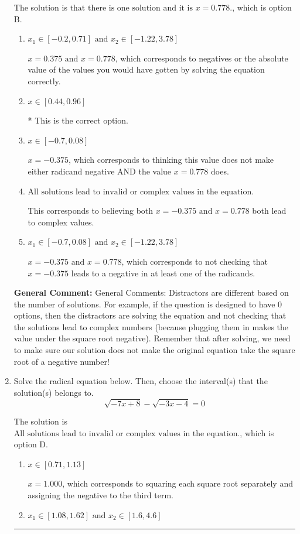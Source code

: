 \documentclass{extbook}[14pt]
\newcommand{\litem}[1]{\item #1

\rule{\textwidth}{0.4pt}}
\begin{document}
\begin{enumerate}
{The solution is \( \text{that there is one solution and it is } x = 0.778. \), which is option B.\begin{enumerate}[label=\Alph*.]
\item \( x_1 \in [-0.2, 0.71] \text{ and } x_2 \in [-1.22,3.78] \)

$x = 0.375 \text{ and } x = 0.778$, which corresponds to negatives or the absolute value of the values you would have gotten by solving the equation correctly.
\item \( x \in [0.44,0.96] \)

* This is the correct option.
\item \( x \in [-0.7,0.08] \)

$x = -0.375$, which corresponds to thinking this value does not make either radicand negative AND the value $x = 0.778$ does.
\item \( \text{All solutions lead to invalid or complex values in the equation.} \)

This corresponds to believing both $x = -0.375 \text{ and } x = 0.778$ both lead to complex values.
\item \( x_1 \in [-0.7, 0.08] \text{ and } x_2 \in [-1.22,3.78] \)

$x = -0.375 \text{ and } x = 0.778$, which corresponds to not checking that $x = -0.375$ leads to a negative in at least one of the radicands.
\end{enumerate}

\textbf{General Comment:} General Comments: Distractors are different based on the number of solutions. For example, if the question is designed to have 0 options, then the distractors are solving the equation and not checking that the solutions lead to complex numbers (because plugging them in makes the value under the square root negative). Remember that after solving, we need to make sure our solution does not make the original equation take the square root of a negative number!
}
\litem{
Solve the radical equation below. Then, choose the interval(s) that the solution(s) belongs to.
\[ \sqrt{-7 x + 8} - \sqrt{-3 x - 4} = 0 \]

The solution is \( \text{All solutions lead to invalid or complex values in the equation.} \), which is option D.\begin{enumerate}[label=\Alph*.]
\item \( x \in [0.71,1.13] \)

$x = 1.000$, which corresponds to squaring each square root separately and assigning the negative to the third term.
\item \( x_1 \in [1.08, 1.62] \text{ and } x_2 \in [1.6,4.6] \)


\end{enumerate}}
\end{enumerate}
\end{document}

